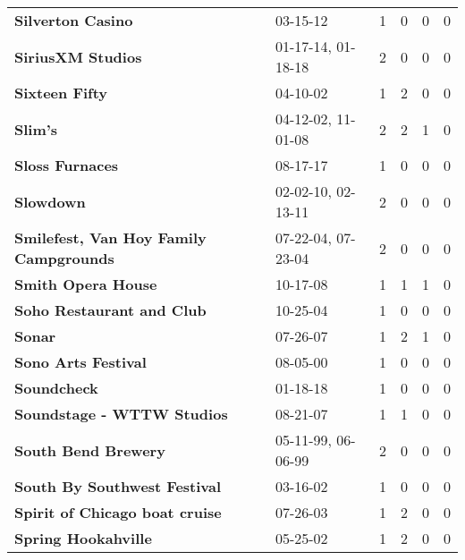\begin{supertabular}{p{0.4\textwidth}p{0.3\textwidth}p{0.05\textwidth}p{0.05\textwidth}p{0.05\textwidth}p{0.05\textwidth}}
                                            \textbf{Silverton Casino} &            03-15-12 &  1 &  0 &  0 &  0 \\
                                            \textbf{SiriusXM Studios} &  01-17-14, 01-18-18 &  2 &  0 &  0 &  0 \\
                                               \textbf{Sixteen Fifty} &            04-10-02 &  1 &  2 &  0 &  0 \\
                                                      \textbf{Slim's} &  04-12-02, 11-01-08 &  2 &  2 &  1 &  0 \\
                                              \textbf{Sloss Furnaces} &            08-17-17 &  1 &  0 &  0 &  0 \\
                                                    \textbf{Slowdown} &  02-02-10, 02-13-11 &  2 &  0 &  0 &  0 \\
                       \textbf{Smilefest, Van Hoy Family Campgrounds} &  07-22-04, 07-23-04 &  2 &  0 &  0 &  0 \\
                                           \textbf{Smith Opera House} &            10-17-08 &  1 &  1 &  1 &  0 \\
                                    \textbf{Soho Restaurant and Club} &            10-25-04 &  1 &  0 &  0 &  0 \\
                                                       \textbf{Sonar} &            07-26-07 &  1 &  2 &  1 &  0 \\
                                          \textbf{Sono Arts Festival} &            08-05-00 &  1 &  0 &  0 &  0 \\
                                                  \textbf{Soundcheck} &            01-18-18 &  1 &  0 &  0 &  0 \\
                                   \textbf{Soundstage - WTTW Studios} &            08-21-07 &  1 &  1 &  0 &  0 \\
                                          \textbf{South Bend Brewery} &  05-11-99, 06-06-99 &  2 &  0 &  0 &  0 \\
                                 \textbf{South By Southwest Festival} &            03-16-02 &  1 &  0 &  0 &  0 \\
                               \textbf{Spirit of Chicago boat cruise} &            07-26-03 &  1 &  2 &  0 &  0 \\
                                          \textbf{Spring Hookahville} &            05-25-02 &  1 &  2 &  0 &  0 \\

\end{supertabular}
